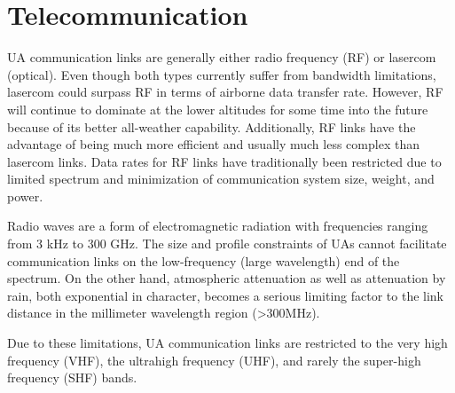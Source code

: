 \chapter{Telecommunication}\label{ch:tele}

UA communication links are generally either radio frequency (RF) or lasercom (optical). Even though both types currently suffer from bandwidth limitations, lasercom could surpass RF in terms of airborne data transfer rate. However, RF will continue to dominate at the lower altitudes for some time into the future because of its better all-weather capability. Additionally, RF links have the advantage of being much more efficient and usually much less complex than lasercom links. Data rates for RF links have traditionally been restricted due to limited spectrum and minimization of communication system size, weight, and power.

Radio waves are a form of electromagnetic radiation with frequencies ranging from 3 kHz to 300 GHz. The size and profile constraints of UAs cannot facilitate communication links on the low-frequency (large wavelength) end of the spectrum. On the other hand, atmospheric attenuation as well as attenuation by rain, both exponential in character, becomes a serious limiting factor to the link distance in the millimeter wavelength region (>300MHz). 
	
Due to these limitations, UA communication links are restricted to the very high frequency (VHF), the ultrahigh frequency (UHF), and rarely the super-high frequency (SHF) bands.

